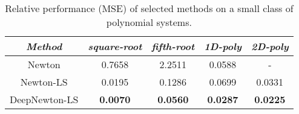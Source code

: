\documentclass{article}
\begin{document}
\begin{table}[h!]
    \vspace{-2mm}
    \centering
    \small
    \begin{tabular}{c | c | c | c | c}
      \textit{Method} & \textit{square-root} & \textit{fifth-root} & \textit{1D-poly} & \textit{2D-poly} \\
      \hline
      Newton & 0.7658 & 2.2511 & 0.0588 & - \\
      Newton-LS & 0.0195 & 0.1286 & 0.0699 & 0.0331 \\
      DeepNewton-LS & \textbf{0.0070} & \textbf{0.0560} & \textbf{0.0287} & \textbf{0.0225}\\
    \end{tabular}
    \vspace{2mm}
    \caption{Relative performance (MSE) of selected methods on a small class of polynomial systems.} \label{tab:newton}
  \vspace{-4mm}
\end{table}


\end{document}

